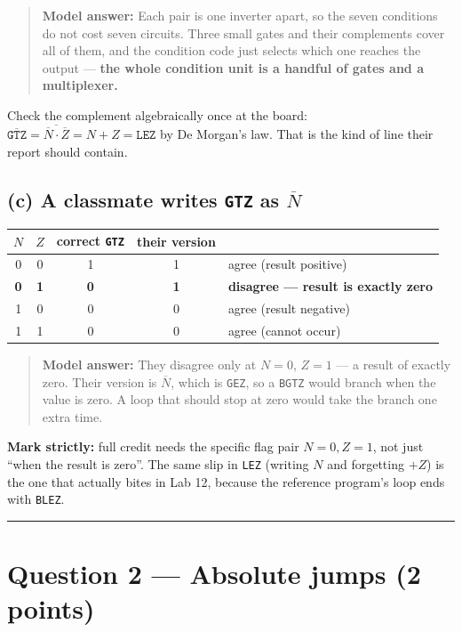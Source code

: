 \documentclass[11pt]{article}
\newcommand{\code}[1]{\texttt{#1}}
\newcommand{\hr}{\vspace{2pt}\hrule\vspace{6pt}}
\begin{document}
\begin{quote}
\textbf{Model answer:} Each pair is one inverter apart, so the seven conditions do
not cost seven circuits. Three small gates and their complements cover all of
them, and the condition code just selects which one reaches the output ---
\textbf{the whole condition unit is a handful of gates and a multiplexer.}
\end{quote}

Check the complement algebraically once at the board:
$\overline{\code{GTZ}} = \overline{\overline{N}\cdot\overline{Z}} = N + Z = \code{LEZ}$
by De Morgan's law. That is the kind of line their report should contain.

\subsection*{(c) A classmate writes \code{GTZ} as $\overline{N}$}

\begin{center}
\begin{tabular}{ccccl}
\toprule
$N$ & $Z$ & correct \code{GTZ} & their version & \\
\midrule
0 & 0 & 1 & 1 & agree (result positive) \\
\textbf{0} & \textbf{1} & \textbf{0} & \textbf{1} & \textbf{disagree --- result is exactly zero} \\
1 & 0 & 0 & 0 & agree (result negative) \\
1 & 1 & 0 & 0 & agree (cannot occur) \\
\bottomrule
\end{tabular}
\end{center}

\begin{quote}
\textbf{Model answer:} They disagree only at $N = 0$, $Z = 1$ --- a result of
exactly zero. Their version is $\overline{N}$, which is \code{GEZ}, so a
\code{BGTZ} would branch when the value is zero. A loop that should stop at zero
would take the branch one extra time.
\end{quote}

\textbf{Mark strictly:} full credit needs the specific flag pair $N{=}0, Z{=}1$,
not just ``when the result is zero''. The same slip in \code{LEZ} (writing $N$ and
forgetting $+Z$) is the one that actually bites in Lab 12, because the reference
program's loop ends with \code{BLEZ}.

\vspace{4pt}\hr

\section*{Question 2 --- Absolute jumps (2 points)}
\end{document}
